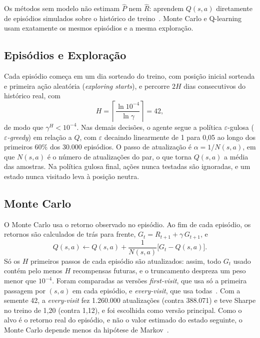 \documentclass[conference]{IEEEtran}
\begin{document}
Os métodos sem modelo não estimam $\hat{P}$ nem $\hat{R}$: aprendem $Q(s,a)$ diretamente de episódios simulados sobre o histórico de treino~\cite{sutton2018}. Monte Carlo e Q-learning usam exatamente os mesmos episódios e a mesma exploração.

\subsection{Episódios e Exploração}

Cada episódio começa em um dia sorteado do treino, com posição inicial sorteada e primeira ação aleatória (\textit{exploring starts}), e percorre $2H$ dias consecutivos do histórico real, com
\begin{equation}
  H = \left\lceil \frac{\ln 10^{-4}}{\ln \gamma} \right\rceil = 42,
\end{equation}
de modo que $\gamma^H < 10^{-4}$. Nas demais decisões, o agente segue a política $\varepsilon$-gulosa (\textit{$\varepsilon$-greedy}) em relação a $Q$, com $\varepsilon$ decaindo linearmente de 1 para 0,05 ao longo dos primeiros 60\% dos 30.000 episódios. O passo de atualização é $\alpha = 1/N(s,a)$, em que $N(s,a)$ é o número de atualizações do par, o que torna $Q(s,a)$ a média das amostras. Na política gulosa final, ações nunca testadas são ignoradas, e um estado nunca visitado leva à posição neutra.

\subsection{Monte Carlo}

O Monte Carlo usa o retorno observado no episódio. Ao fim de cada episódio, os retornos são calculados de trás para frente, $G_t = R_{t+1} + \gamma\, G_{t+1}$, e
\begin{equation}
  Q(s,a) \leftarrow Q(s,a) + \frac{1}{N(s,a)} \big[G_t - Q(s,a)\big].
\end{equation}
Só os $H$ primeiros passos de cada episódio são atualizados: assim, todo $G_t$ usado contém pelo menos $H$ recompensas futuras, e o truncamento despreza um peso menor que $10^{-4}$. Foram comparadas as versões \textit{first-visit}, que usa só a primeira passagem por $(s,a)$ em cada episódio, e \textit{every-visit}, que usa todas~\cite{sutton2018}. Com a semente 42, a \textit{every-visit} fez 1.260.000 atualizações (contra 388.071) e teve Sharpe no treino de 1,20 (contra 1,12), e foi escolhida como versão principal. Como o alvo é o retorno real do episódio, e não o valor estimado do estado seguinte, o Monte Carlo depende menos da hipótese de Markov~\cite{sutton2018}.
\end{document}
